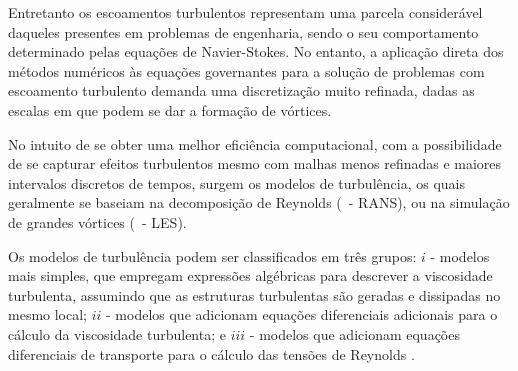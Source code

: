 Entretanto os escoamentos turbulentos representam uma parcela considerável daqueles presentes em problemas de engenharia, sendo o seu comportamento determinado pelas equações de Navier-Stokes. No entanto, a aplicação direta dos métodos numéricos às equações governantes para a solução de problemas com escoamento turbulento demanda uma discretização muito refinada, dadas as escalas em que podem se dar a formação de vórtices.



No intuito de se obter uma melhor eficiência computacional, com a possibilidade de se capturar efeitos turbulentos mesmo com malhas menos refinadas e maiores intervalos discretos de tempos, surgem os modelos de turbulência, os quais geralmente se baseiam na decomposição de Reynolds (\RANS\ - RANS), ou na simulação de grandes vórtices (\LES\ - LES).

Os modelos de turbulência podem ser classificados em três grupos: $i$ - modelos mais simples, que empregam expressões algébricas para descrever a viscosidade turbulenta, assumindo que as estruturas turbulentas são geradas e dissipadas no mesmo local; $ii$ - modelos que adicionam equações diferenciais adicionais para o cálculo da viscosidade turbulenta; e $iii$ - modelos que adicionam equações diferenciais de transporte para o cálculo das tensões de Reynolds \cite{souza2011revisao,alfonsi2009reynolds,teixeira2001simulaccao}.



